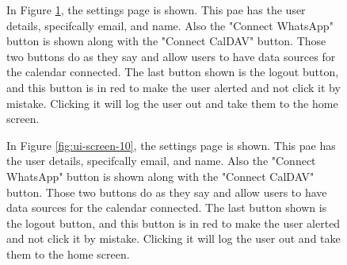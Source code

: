 \begin{figure}[!h]
\begin{minipage}{0.3\textwidth}
        \label{fig:ui-screen-9}
    \end{minipage}
    \hfill
    \begin{minipage}{0.65\textwidth}
        In Figure \ref{fig:ui-screen-9}, the settings page is shown. This pae has the user details, specifcally email, and name. Also the "Connect WhatsApp" button is shown along with the "Connect CalDAV" button. Those two buttons do as they say and allow users to have data sources for the calendar connected. The last button shown is the logout button, and this button is in red to make the user alerted and not click it by mistake. Clicking it will log the user out and take them to the home screen.
    \end{minipage}
\end{figure}

\begin{figure}[!h]
    \begin{minipage}{0.65\textwidth}
        In Figure \ref{fig:ui-screen-10}, the settings page is shown. This pae has the user details, specifcally email, and name. Also the "Connect WhatsApp" button is shown along with the "Connect CalDAV" button. Those two buttons do as they say and allow users to have data sources for the calendar connected. The last button shown is the logout button, and this button is in red to make the user alerted and not click it by mistake. Clicking it will log the user out and take them to the home screen.
    \end{minipage}
    \hfill
    \begin{minipage}{0.3\textwidth}
        \centering

\end{minipage}
\end{figure}
